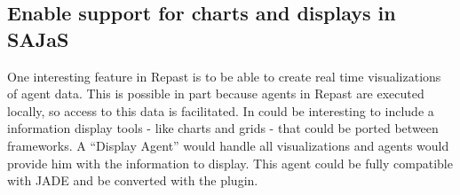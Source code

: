 \subsection{Enable support for charts and displays in SAJaS}
One interesting feature in Repast is to be able to create real time visualizations of agent data. This is possible in part because agents in Repast are executed locally, so access to this data is facilitated. In could be interesting to include a information display tools - like charts and grids - that could be ported between frameworks. A ``Display Agent'' would handle all visualizations and agents would provide him with the information to display. This agent could be fully compatible with JADE and be converted with the plugin.
